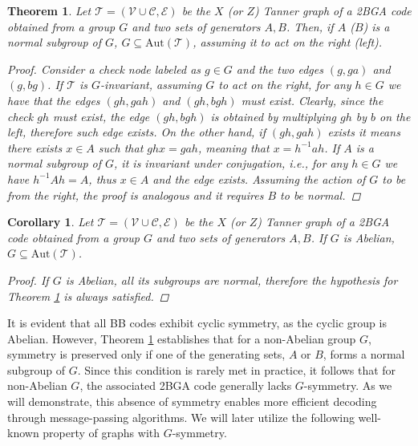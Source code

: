 \documentclass[a4paper,twocolumn,11pt,accepted=2026-05-03]{quantumarticle}
\newtheorem{theorem}{Theorem}
\newtheorem{corollary}{Corollary}
\newcommand{\setv}{\mathcal{V}}
\newcommand{\setc}{\mathcal{C}}
\newcommand{\sete}{\mathcal{E}}
\begin{document}
\begin{theorem}
\label{th:invariance}
    Let $\mathcal{T} = (\setv \cup \setc,\sete)$ be the $X$ (or $Z$) Tanner graph of a 2BGA code obtained from a group $G$ and two sets of generators $A,B$. Then, if $A$ ($B$) is a normal subgroup of $G$, $G \subseteq \mathrm{Aut}(\mathcal{T})$, assuming it to act on the right (left).
    \begin{proof}
        Consider a check node labeled as $g \in G$ and the two edges $(g,ga)$ and $(g,bg)$. If $\mathcal{T}$ is $G$-invariant, assuming $G$ to act on the right, for any $h\in G$ we have that the edges $(gh,gah)$ and $(gh,bgh)$ must exist. Clearly, since the check $gh$ must exist, the edge $(gh,bgh)$ is obtained by multiplying $gh$ by $b$ on the left, therefore such edge exists. On the other hand, if $(gh,gah)$ exists it means there exists $x\in A$ such that $ghx = gah$, meaning that $x=h^{-1}ah$. If $A$ is a normal subgroup of $G$, it is invariant under conjugation, \textit{i.e.}, for any $h \in G$ we have $h^{-1}Ah=A$, thus $x\in A$ and the edge exists. Assuming the action of $G$ to be from the right, the proof is analogous and it requires $B$ to be normal.
    \end{proof}
\end{theorem}

\begin{corollary}
    Let $\mathcal{T} = (\setv \cup \setc,\sete)$ be the $X$ (or $Z$) Tanner graph of a 2BGA code obtained from a group $G$ and two sets of generators $A,B$. If $G$ is Abelian, $G \subseteq \mathrm{Aut}(\mathcal{T})$.
    \begin{proof}
    If $G$ is Abelian, all its subgroups are normal, therefore the hypothesis for Theorem \ref{th:invariance} is always satisfied.
    \end{proof}
    \label{th:abelian}
\end{corollary}

It is evident that all BB codes exhibit cyclic symmetry, as the cyclic group is Abelian. However, Theorem \ref{th:invariance} establishes that for a non-Abelian group \( G \), symmetry is preserved only if one of the generating sets, \( A \) or \( B \), forms a normal subgroup of \( G \). Since this condition is rarely met in practice, it follows that for non-Abelian \( G \), the associated 2BGA code generally lacks \( G \)-symmetry. As we will demonstrate, this absence of symmetry enables more efficient decoding through message-passing algorithms. We will later utilize the following well-known property of graphs with $G$-symmetry.
\end{document}
